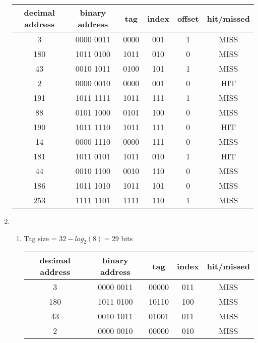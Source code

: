 \documentclass{article}
\def\math#1{$#1$}
\begin{document}
\begin{enumerate}[1)]
\begin{center}
\begin{tabular}{ |c|c|c|c|c|c| }
             \hline
             decimal address & binary address & tag & index & offset & hit/missed \\
             \hline
             3 & 0000 0011 & 0000 & 001 & 1 & MISS \\  
             \hline
             180 & 1011 0100 & 1011 & 010 & 0 & MISS \\
             \hline
             43 & 0010 1011 & 0100 & 101 & 1 & MISS \\
             \hline
             2 & 0000 0010 & 0000 & 001 & 0 & HIT \\
             \hline
             191 & 1011 1111 & 1011 & 111 & 1 & MISS\\
             \hline
             88 & 0101 1000 & 0101 & 100 & 0 & MISS \\
             \hline
             190 & 1011 1110 & 1011 & 111 & 0 & HIT \\
             \hline
             14 & 0000 1110 & 0000 & 111 & 0 & MISS \\
             \hline
             181 & 1011 0101 & 1011 & 010 & 1 & HIT \\
             \hline
             44 & 0010 1100 & 0010 & 110 & 0 & MISS \\
             \hline
             186 & 1011 1010 & 1011 & 101 & 0 & MISS \\
             \hline
             253 & 1111 1101 & 1111 & 110 & 1 & MISS \\
             \hline
            \end{tabular}
        \end{center}
    \item 
        \begin{enumerate}[\text{C}1)]
            \item Tag size = \math{32 - log_2(8) = 29} bits
            \begin{center}
                \begin{tabular}{ |c|c|c|c|c| }
                 \hline
                 decimal address & binary address & tag & index & hit/missed \\
                 \hline
                 3 & 0000 0011 & 00000 & 011 & MISS \\  
                 \hline
                 180 & 1011 0100 & 10110 & 100 & MISS \\
                 \hline
                 43 & 0010 1011 & 01001 & 011 & MISS \\
                 \hline
                 2 & 0000 0010 & 00000 & 010 & MISS \\

\end{tabular}
\end{center}
\end{enumerate}
\end{enumerate}
\end{document}
